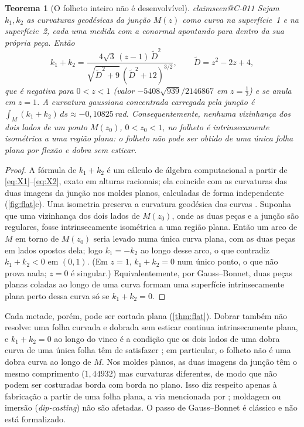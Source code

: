 \documentclass[11pt,a4paper]{article}
\makeatletter
\theoremstyle{plain}
\newtheorem{theorem}{Teorema}[section]
\theoremstyle{remark}
\newcommand{\claim}[1]{\ifcsname claimseen@#1\endcsname\else\expandafter\gdef\csname claimseen@#1\endcsname{}\label{claim:#1}\fi}
\makeatother
\begin{document}
\begin{theorem}[O folheto inteiro não é desenvolvível]\label{thm:notflat}\claim{C-011}
Sejam $k_1,k_2$ as curvaturas geodésicas da junção $M(z)$ como curva na superfície~1 e na superfície~2, cada uma medida com a
conormal apontando para dentro da sua própria peça. Então
\[ k_1+k_2=\frac{4\sqrt3\,(z-1)\,\tilde D^2}{\sqrt{\tilde D^2+9}\,(\tilde D^2+12)^{3/2}},\qquad \tilde D=z^2-2z+4, \]
que é negativa para $0<z<1$ (valor $-5408\sqrt{939}/2146867$ em $z=\tfrac12$) e se anula em $z=1$. A curvatura gaussiana
concentrada carregada pela junção é $\int_M(k_1+k_2)\,ds\approx-0{,}10825$\,rad. Consequentemente, nenhuma vizinhança dos
dois lados de um ponto $M(z_0)$, $0<z_0<1$, no folheto é intrinsecamente isométrica a uma região plana: o folheto não pode
ser obtido de uma única folha plana por flexão e dobra sem esticar.
\end{theorem}
\begin{proof}
A fórmula de $k_1+k_2$ é um cálculo de álgebra computacional a partir de \eqref{eq:X1}--\eqref{eq:X2}, exato em alturas
racionais; ela coincide com as curvaturas das duas imagens da junção nos moldes planos, calculadas de forma independente
(\cref{fig:flat}c). Uma isometria preserva a curvatura geodésica das curvas \citep[prova do seu teorema
principal]{FuchsTabachnikov1999}. Suponha que uma vizinhança dos dois lados de $M(z_0)$, onde as duas peças e a junção são
regulares, fosse intrinsecamente isométrica a uma região plana. Então um arco de $M$ em torno de $M(z_0)$ seria levado numa
única curva plana, com as duas peças em lados opostos dela; logo $k_1=-k_2$ ao longo desse arco, o que contradiz $k_1+k_2<0$
em $(0,1)$. (Em $z=1$, $k_1+k_2=0$ num único ponto, o que não prova nada; $z=0$ é singular.) Equivalentemente, por
Gauss--Bonnet, duas peças planas coladas ao longo de uma curva formam uma superfície intrinsecamente plana perto dessa curva
só se $k_1+k_2=0$.
\end{proof}

Cada metade, porém, pode ser cortada plana (\cref{thm:flat}). Dobrar também não resolve: uma folha curvada e dobrada sem
esticar continua intrinsecamente plana, e $k_1+k_2=0$ ao longo do vinco é a condição que os dois lados de uma dobra curva de
uma única folha têm de satisfazer \citep{FuchsTabachnikov1999}; em particular, o folheto não é uma dobra curva ao longo de $M$.
Nos moldes planos, as duas imagens da junção têm o mesmo comprimento ($1{,}44932$) mas curvaturas diferentes, de modo que não
podem ser costuradas borda com borda no plano. Isso diz respeito apenas à fabricação a partir de uma folha plana, a via
mencionada por \citet{Oliveira2024}; moldagem ou imersão (\emph{dip-casting}) não são afetadas. O passo de Gauss--Bonnet é
clássico e não está formalizado.
\end{document}
